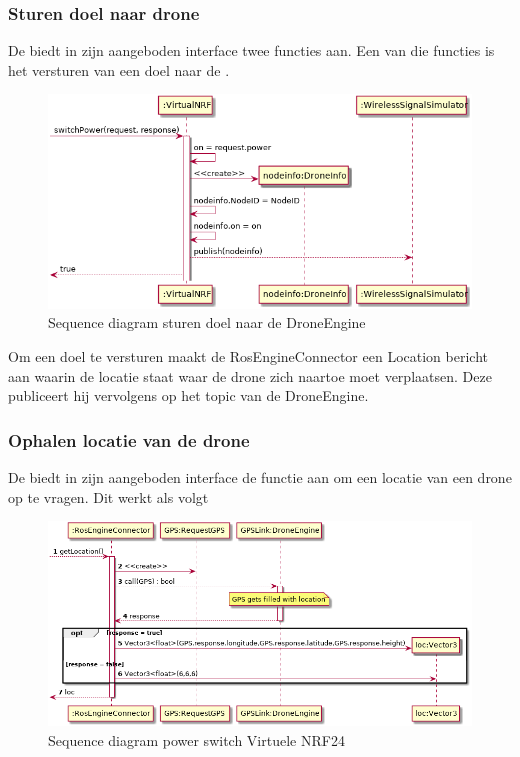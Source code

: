 \documentclass[a4paper, 11pt, oneside]{report}
\begin{document}
\subsubsection{Sturen doel naar drone}
\label{DetailedDesign:ros:sequence:sturendoelnaarengine}

De  biedt in zijn aangeboden interface twee functies aan.
Een van die functies is het versturen van een doel naar de . 

\begin{figure}[H]
	\begin{center}\includegraphics[width=.8\linewidth]{UML/out/ros/sequence/powerSwitch/powerSwitch.png}\end{center}
	\caption{Sequence diagram sturen doel naar de DroneEngine}
	\label{fig:ros:sequence:sequence:sturendoelnaarengine}
\end{figure}

Om een doel te versturen maakt de RosEngineConnector een Location bericht aan waarin de locatie staat waar de drone zich naartoe moet verplaatsen.
Deze publiceert hij vervolgens op het topic van de DroneEngine.

\subsubsection{Ophalen locatie van de drone}
\label{DetailedDesign:ros:sequence:ophalenlocatie}

De  biedt in zijn aangeboden interface de functie aan om een locatie van een drone op te vragen. Dit werkt als volgt

\begin{figure}[H]
	\begin{center}\includegraphics[width=.9\linewidth]{UML/out/ros/sequence/getLocation/getLocation.png}\end{center}
	\caption{Sequence diagram power switch Virtuele NRF24}
	\label{fig:ros:sequence:sequence:ophalenlocatie}
\end{figure}
\end{document}
